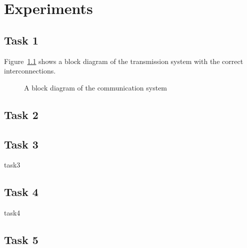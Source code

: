 \documentclass[11pt,titlepage]{report}
\begin{document}
\chapter{Experiments}
\section{Task 1}
Figure~\ref{fig:block-diagram} shows a block diagram of the transmission system with the correct interconnections.

\begin{figure}[H]
	\centering
	
	\caption{A block diagram of the communication system}
	\label{fig:block-diagram}
\end{figure}

\section{Task 2}

\section{Task 3}
{task3}

\section{Task 4}
{task4}

\section{Task 5}
\end{document}
